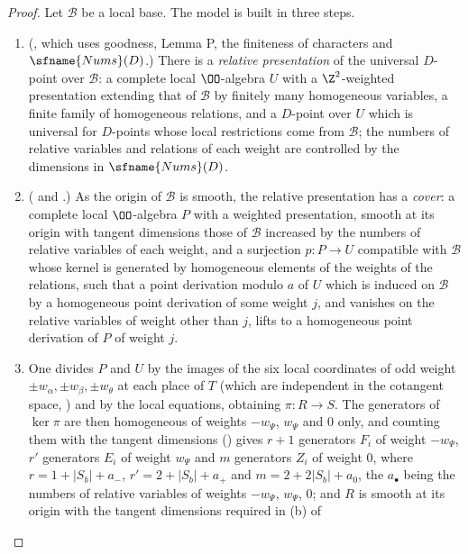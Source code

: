 \begin{proof}
Let $\mathcal B$ be a local base. The model is built in three steps.
\begin{enumerate}[label=(\arabic*)]
\item (, which uses goodness, Lemma P, the finiteness of
characters and $\sfname{Nums}(D)$.) There is a \emph{relative presentation} of the universal $D$-point over $\mathcal B$: a
complete local $\OO$-algebra $U$ with a $\Z^2$-weighted presentation extending that of $\mathcal B$ by finitely many
homogeneous variables, a finite family of homogeneous relations, and a $D$-point over $U$ which is universal for
$D$-points whose local restrictions come from $\mathcal B$; the numbers of relative variables and relations of each weight are
controlled by the dimensions in $\sfname{Nums}(D)$.
\item ( and .)
As the origin of $\mathcal B$ is smooth, the relative presentation has a \emph{cover}: a complete local $\OO$-algebra $P$
with a weighted presentation, smooth at its origin with tangent dimensions those of $\mathcal B$ increased by the numbers
of relative variables of each weight, and a surjection $p:P\to U$ compatible with $\mathcal B$ whose kernel is generated by
homogeneous elements of the weights of the relations, such that a point derivation modulo $a$ of $U$ which is induced on
$\mathcal B$ by a homogeneous point derivation of some weight $j$, and vanishes on the relative variables of weight other
than $j$, lifts to a homogeneous point derivation of $P$ of weight $j$.
\item One divides $P$ and $U$ by the images of the six local coordinates of odd weight $\pm w_\alpha,\pm w_\beta,\pm
w_\theta$ at each place of $T$ (which are independent in the cotangent space,
) and by the local equations, obtaining $\pi:R\to S$.
The generators of $\ker\pi$ are then homogeneous of weights $-w_\Psi$, $w_\Psi$ and $0$ only, and counting them with the
tangent dimensions () gives $r+1$ generators $F_i$ of
weight $-w_\Psi$, $r'$ generators $E_i$ of weight $w_\Psi$ and $m$ generators $Z_i$ of weight $0$, where
$r=1+|S_b|+a_-$, $r'=2+|S_b|+a_+$ and $m=2+2|S_b|+a_0$, the $a_\bullet$ being the numbers of relative variables of
weights $-w_\Psi$, $w_\Psi$, $0$; and $R$ is smooth at its origin with the tangent dimensions required in (b) of

\end{enumerate}
\end{proof}
